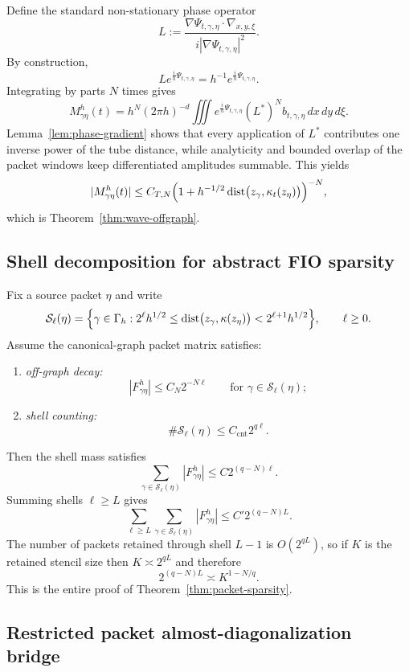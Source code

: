 Define the standard non-stationary phase operator
\[
L
:=
\frac{\nabla\Psi_{t,\gamma,\eta}\cdot\nabla_{x,y,\xi}}
{i|\nabla\Psi_{t,\gamma,\eta}|^2}.
\]
By construction,
\[
L e^{\frac{i}{h}\Psi_{t,\gamma,\eta}}
=
h^{-1} e^{\frac{i}{h}\Psi_{t,\gamma,\eta}}.
\]
Integrating by parts $N$ times gives
\[
M_{\gamma\eta}^h(t)
=
h^N
(2\pi h)^{-d}
\iiint
e^{\frac{i}{h}\Psi_{t,\gamma,\eta}}
(L^\ast)^N b_{t,\gamma,\eta}\,dx\,dy\,d\xi.
\]
Lemma~\ref{lem:phase-gradient} shows that every application of $L^\ast$ contributes one inverse power of the tube distance, while analyticity and bounded overlap of the packet windows keep differentiated amplitudes summable. This yields
\[
|M_{\gamma\eta}^h(t)|
\le
C_{T,N}
\Bigl(1+h^{-1/2}\,\mathrm{dist}\bigl(z_\gamma,\kappa_t(z_\eta)\bigr)\Bigr)^{-N},
\]
which is Theorem~\ref{thm:wave-offgraph}.

\subsection{Shell decomposition for abstract FIO sparsity}

Fix a source packet $\eta$ and write
\[
\mathcal S_\ell(\eta)
=
\Bigl\{
\gamma\in\Gamma_h :
2^\ell h^{1/2}
\le
\mathrm{dist}\bigl(z_\gamma,\kappa(z_\eta)\bigr)
<
2^{\ell+1} h^{1/2}
\Bigr\},
\qquad \ell\ge 0.
\]
Assume the canonical-graph packet matrix satisfies:
\begin{enumerate}
\item \emph{off-graph decay:}
\[
|F_{\gamma\eta}^h|
\le
C_N 2^{-N\ell}
\qquad\text{for }\gamma\in\mathcal S_\ell(\eta);
\]
\item \emph{shell counting:}
\[
\#\mathcal S_\ell(\eta)\le C_{\mathrm{cnt}}2^{q\ell}.
\]
\end{enumerate}
Then the shell mass satisfies
\[
\sum_{\gamma\in\mathcal S_\ell(\eta)} |F_{\gamma\eta}^h|
\le
C 2^{(q-N)\ell}.
\]
Summing shells $\ell\ge L$ gives
\[
\sum_{\ell\ge L}\sum_{\gamma\in\mathcal S_\ell(\eta)} |F_{\gamma\eta}^h|
\le
C' 2^{(q-N)L}.
\]
The number of packets retained through shell $L-1$ is $O(2^{qL})$, so if $K$ is the retained stencil size then $K\asymp 2^{qL}$ and therefore
\[
2^{(q-N)L}\asymp K^{1-N/q}.
\]
This is the entire proof of Theorem~\ref{thm:packet-sparsity}.

\subsection{Restricted packet almost-diagonalization bridge}

